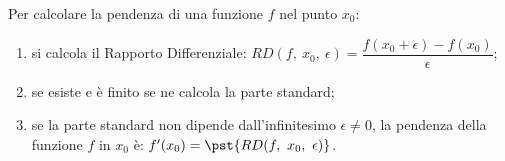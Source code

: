 \begin{procedura}
\label{proc:ricetta_pendenza}
Per calcolare la pendenza di una funzione \(f\) nel punto \(x_0\):
\begin{enumerate}
\item si calcola il Rapporto Differenziale:
\(RD(f,~x_0,~\epsilon)= \dfrac{f(x_0+\epsilon) -f(x_0)}{\epsilon}\);
\item se esiste e è finito se ne calcola la parte standard;
\item se la parte standard non dipende dall'infinitesimo 
\(\epsilon \neq 0\), la pendenza della funzione \(f\) in \(x_0\) è:
\(f'(x_0) = \pst{RD(f,~x_0,~\epsilon)}\).
\end{enumerate}
\end{procedura}
% 

